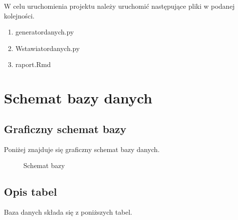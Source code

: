 \documentclass{article}
\begin{document}
	W celu uruchomienia projektu należy uruchomić następujące pliki w podanej kolejności.
	
	\begin{enumerate}
		\item generator\textunderscore danych.py
		\item Wstawiator\textunderscore danych.py
		\item raport.Rmd
	\end{enumerate}
	
	\section{Schemat bazy danych}
	
	\subsection{Graficzny schemat bazy}
	
	Poniżej znajduje się graficzny schemat bazy danych.
	
	\begin{figure}[H]
		\centering
		\caption{Schemat bazy}
	\end{figure}
	
	\subsection{Opis tabel}
	
	Baza danych składa się z poniższych tabel. 
	
\end{document}
